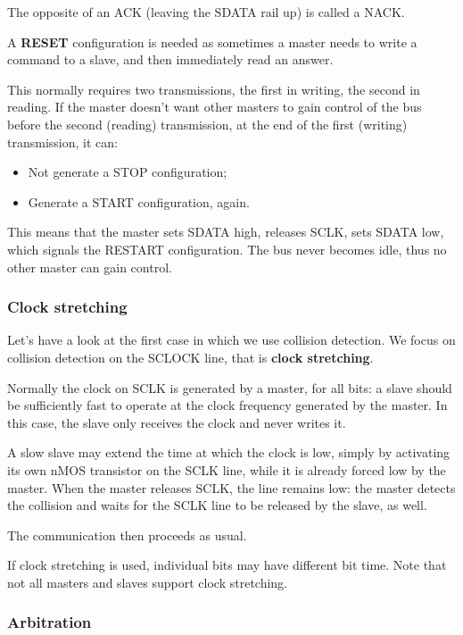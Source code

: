 \documentclass[a4paper,11pt]{article}
\begin{document}
The opposite of an ACK (leaving the SDATA rail up) is called a NACK.

\par\smallskip

A \textbf{RESET} configuration is needed as sometimes a master needs to write a command to a slave, and then immediately read an answer.

This normally requires two transmissions, the first in writing, the second in reading. If the master doesn’t want other masters to gain control of the bus before the second (reading) transmission, at the end of the first (writing) transmission, it can:
\begin{itemize}
	\item Not generate a STOP configuration;
	\item Generate a START configuration, again.
\end{itemize}

This means that the master sets SDATA high, releases SCLK, sets SDATA low, which signals the RESTART configuration.
The bus never becomes idle, thus no other master can gain control.

\subsubsection{Clock stretching}

Let's have a look at the first case in which we use collision detection.
We focus on collision detection on the SCLOCK line, that is \textbf{clock stretching}.

Normally the clock on SCLK is generated by a master, for all bits: a slave should be sufficiently fast to operate at the clock frequency generated by the master.
In this case, the slave only receives the clock and never writes it.

A slow slave may extend the time at which the clock is low, simply by activating its own nMOS transistor on the SCLK line, while it is already forced low by the master.
When the master releases SCLK, the line remains low: the master detects the collision and waits for the SCLK line to be released by the slave, as well.

The communication then proceeds as usual.

If clock stretching is used, individual bits may have different bit time.
Note that not all masters and slaves support clock stretching.

\subsubsection{Arbitration}
\end{document}
